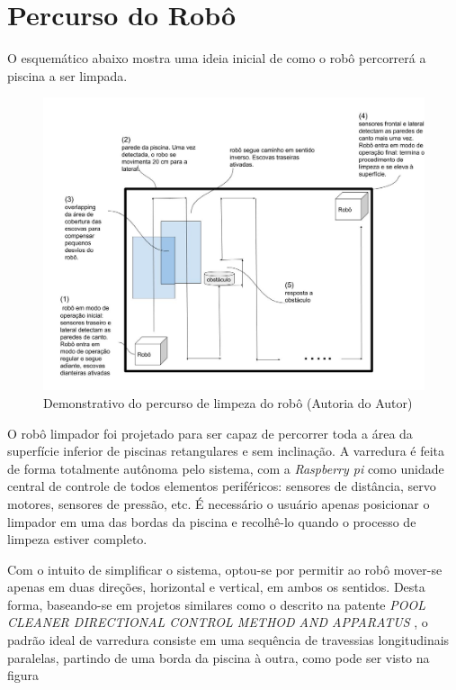 \section{Percurso do Robô}
O esquemático abaixo mostra uma ideia inicial de como o robô percorrerá a piscina
a ser limpada.
\par
\begin{figure}[h]
    \centering
    \includegraphics[width=\textwidth]{figures/schema-way-robot.jpg}
    \caption{Demonstrativo do percurso de limpeza do robô (\textsf{Autoria do Autor})}
    \label{fig:schema-way-robot}
  \end{figure}
\par
O robô limpador foi projetado para ser capaz de percorrer toda a área da superfície
inferior de piscinas retangulares e sem inclinação. A varredura é feita de forma
totalmente autônoma pelo sistema, com a \textit{Raspberry pi} como unidade central de
controle de todos elementos periféricos: sensores de distância, servo motores,
sensores de pressão, etc. É necessário o usuário apenas posicionar o limpador em
uma das bordas da piscina e recolhê-lo quando o processo de limpeza estiver completo.
\par
Com o intuito de simplificar o sistema, optou-se por permitir ao robô mover-se apenas
em duas direções, horizontal e vertical, em ambos os sentidos. Desta forma,
baseando-se em projetos similares como o descrito na patente \textit{POOL CLEANER
DIRECTIONAL CONTROL METHOD AND APPARATUS} \cite{porat2001}, o
padrão ideal de varredura consiste em uma sequência de travessias longitudinais
paralelas, partindo de uma borda da piscina à outra, como pode ser visto na figura
